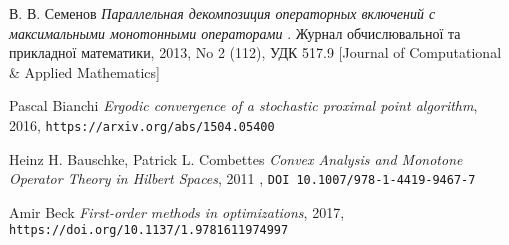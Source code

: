 \documentclass[main.tex]{subfile}
\begin{document}
   		\begin{thebibliography}{9}
   		В. В. Семенов 
   		\textit{Параллельная декомпозиция операторных включений с максимальными монотонными операторами
   		}. 
   		Журнал обчислювальної та
   		прикладної математики,
   		2013, No 2 (112),
   		УДК 517.9
   		[Journal of Computational
   		\& Applied Mathematics]
   		
   		
   		Pascal Bianchi
   		\textit{Ergodic convergence of a stochastic proximal point algorithm},
   		2016,
   		\texttt{https://arxiv.org/abs/1504.05400}
   		
   		
   		Heinz H. Bauschke,
   		Patrick L. Combettes
   		\textit{Convex Analysis and
   			Monotone Operator Theory
   			in Hilbert Spaces},
   		2011
   		,
   		\texttt{DOI 10.1007/978-1-4419-9467-7}
   		
   		
   		Amir Beck
   		\textit{First-order methods in optimizations},
   		2017,
   		\texttt{https://doi.org/10.1137/1.9781611974997}
   	\end{thebibliography}
   
\end{document}
